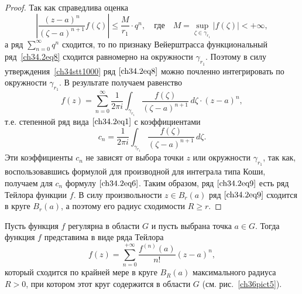 \begin{proof}
Так как справедлива оценка
$$
\left| \frac{(z - a)^n}{(\zeta - a)^{n + 1}} f(\zeta) \right| \le \frac{M}{r_1} \cdot q^n, \quad \text{где} \quad M = \sup_{\zeta \in \gamma_{r_1}} |f(\zeta)| < +\infty,
$$
а ряд $\sum\limits_{n = 0}^{\infty} q^n$ сходится, то по признаку Вейерштрасса функциональный ряд~\eqref{ch34.2eq8} сходится равномерно на окружности $\gamma_{r_1}$. Поэтому в силу утверждения~\ref{ch34stt1000} ряд $\eqref{ch34.2eq8}$ можно почленно интегрировать по окружности $\gamma_{r_1}$. В результате получаем равенство
\begin{equation} \label{ch34.2eq9}
f(z) = \sum\limits_{n = 0}^{\infty} \frac{1}{2\pi i} \int_{\gamma_{r_1}} \frac{f(\zeta)}{(\zeta - a)^{n + 1}} \,d\zeta \cdot (z - a)^n,
\end{equation}
т.е. степенной ряд вида $\eqref{ch34.2eq1}$ с коэффициентами
\begin{equation} \label{ch34.2eq10}
c_n = \frac{1}{2\pi i} \int_{\gamma_{r_1}} \frac{f(\zeta)}{(\zeta - a)^{n + 1}} \,d\zeta.
\end{equation}
Эти коэффициенты $c_n$ не зависят от выбора точки $z$ или окружности $\gamma_{r_1}$, так как, воспользовавшись формулой для производной для интеграла типа Коши, получаем для $c_n$ формулу $\eqref{ch34.2eq6}$. Таким образом, ряд $\eqref{ch34.2eq9}$ есть ряд Тейлора функции $f$. В силу произвольности $z \in B_r(a)$ ряд $\eqref{ch34.2eq9}$ сходится в круге $B_r(a)$, а поэтому его радиус сходимости $R \ge r$.
\end{proof}

\begin{cons} \label{cons1}
Пусть функция $f$ регулярна в области $G$ и пусть выбрана точка $a \in G$. Тогда функция $f$ представима в виде ряда Тейлора 
$$
f(z) = \sum\limits_{n = 0}^{+\infty} \frac{f^{(n)}(a)}{n!} (z - a)^n,
$$
который сходится по крайней мере в круге $B_R(a)$ максимального радиуса $R > 0$, при котором этот круг содержится в области $G$ (см. рис.~\ref{ch36pict5}).
\end{cons}
